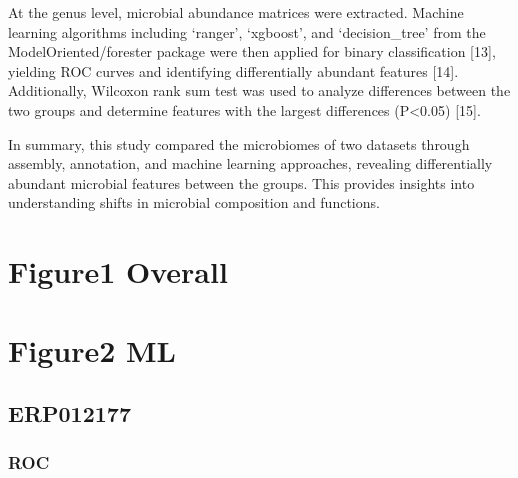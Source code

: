\documentclass[
]{article}
\begin{document}
At the genus level, microbial abundance matrices were extracted. Machine
learning algorithms including `ranger', `xgboost', and `decision\_tree'
from the ModelOriented/forester package were then applied for binary
classification {[}13{]}, yielding ROC curves and identifying
differentially abundant features {[}14{]}. Additionally, Wilcoxon rank
sum test was used to analyze differences between the two groups and
determine features with the largest differences (P\textless0.05)
{[}15{]}.

In summary, this study compared the microbiomes of two datasets through
assembly, annotation, and machine learning approaches, revealing
differentially abundant microbial features between the groups. This
provides insights into understanding shifts in microbial composition and
functions.

\hypertarget{figure1-overall}{%
\section{Figure1 Overall}\label{figure1-overall}}

\hypertarget{figure2-ml}{%
\section{Figure2 ML}\label{figure2-ml}}

\hypertarget{erp012177}{%
\subsection{ERP012177}\label{erp012177}}

\hypertarget{roc}{%
\subsubsection{ROC}\label{roc}}
\end{document}
